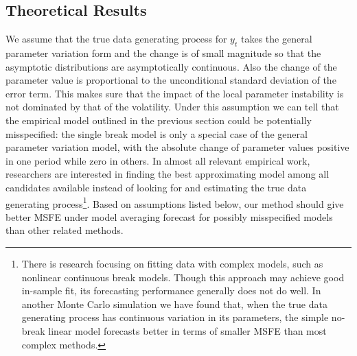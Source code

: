 \subsection{Theoretical Results}
We assume that the true data generating process for $y_t$ takes the general parameter variation form and the change is of small magnitude so that the asymptotic distributions are asymptotically continuous. Also the change of the parameter value is proportional to the unconditional standard deviation of the error term. This makes sure that the impact of the local parameter instability is not dominated by that of the volatility. Under this assumption we can tell that the empirical model outlined in the previous section could be potentially misspecified: the single break model is only a special case of the general parameter variation model, with the absolute change of parameter values positive in one period while zero in others. In almost all relevant empirical work, researchers are interested in finding the best approximating model among all candidates available instead of looking for and estimating the true data generating process\footnote{There is research focusing on fitting data with complex models, such as nonlinear continuous break models. Though this approach may achieve good in-sample fit, its forecasting performance generally does not do well. In another Monte Carlo simulation we have found that, when the true data generating process has continuous variation in its parameters, the simple no-break linear model forecasts better in terms of smaller MSFE than most complex methods.}. Based on assumptions listed below, our method should give better MSFE under model averaging forecast for possibly misspecified models than other related methods.
